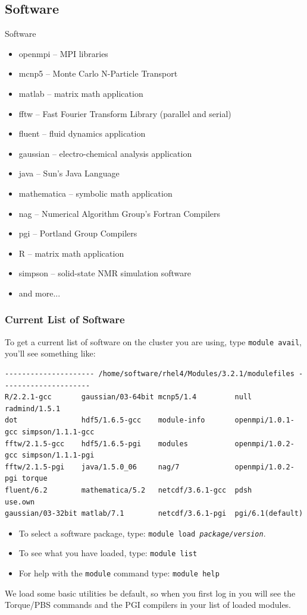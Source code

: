 \documentclass{beamer}
\begin{document}
  \subsection {Software}
  \begin{frame}{Software}
    \begin{itemize}
    \item openmpi -- MPI libraries
    \item mcnp5 -- Monte Carlo N-Particle Transport
    \item matlab -- matrix math application
    \item fftw -- Fast Fourier Transform Library (parallel and serial)
    \item fluent -- fluid dynamics application
    \item gaussian -- electro-chemical analysis application
    \item java -- Sun's Java Language
    \item mathematica -- symbolic math application
    \item nag -- Numerical Algorithm Group's Fortran Compilers
    \item pgi -- Portland Group Compilers
    \item R -- matrix math application
    \item simpson -- solid-state NMR simulation software
    \item and more...
    \end{itemize}
  \end{frame}
\begin{frame}[fragile]
    \frametitle{Current List of Software}
    To get a current list of software on the cluster you are using, type
    \texttt{module~avail}, you'll see something like:
    \tiny
\begin{verbatim}
--------------------- /home/software/rhel4/Modules/3.2.1/modulefiles ---------------------
R/2.2.1-gcc       gaussian/03-64bit mcnp5/1.4         null              radmind/1.5.1  
dot               hdf5/1.6.5-gcc    module-info       openmpi/1.0.1-gcc simpson/1.1.1-gcc  
fftw/2.1.5-gcc    hdf5/1.6.5-pgi    modules           openmpi/1.0.2-gcc simpson/1.1.1-pgi 
fftw/2.1.5-pgi    java/1.5.0_06     nag/7             openmpi/1.0.2-pgi torque 
fluent/6.2        mathematica/5.2   netcdf/3.6.1-gcc  pdsh              use.own 
gaussian/03-32bit matlab/7.1        netcdf/3.6.1-pgi  pgi/6.1(default) 
\end{verbatim}
    \normalsize
    \begin{itemize}
    \item To select a software package, type: \texttt{module~load~\textit{package/version}}.
    \item To see what you have loaded, type: \texttt{module~list}
    \item For help with the \texttt{module} command type: \texttt{module~help}
    \end{itemize}
    We load some basic utilities be default, so when you first log in you will see
    the Torque/PBS commands and the PGI compilers in your list of loaded modules.
\end{frame}
  
\end{document}
